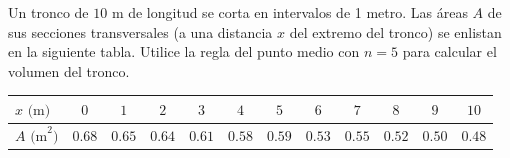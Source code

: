\item Un tronco de $10 \text{ m}$ de longitud se corta en intervalos de 1 metro. Las áreas $A$ de sus secciones transversales (a una distancia $x$ del extremo del tronco) se enlistan en la siguiente tabla. Utilice la regla del punto medio con $n = 5$ para calcular el volumen del tronco.

\begin{center}
\renewcommand{\arraystretch}{1.5}
\begin{tabular}{|l|ccccccccccc|}
\hline
$x \text{ (m)}$ & $0$ & $1$ & $2$ & $3$ & $4$ & $5$ & $6$ & $7$ & $8$ & $9$ & $10$ \\ \hline
$A \text{ (m}^2\text{)}$ & $0.68$ & $0.65$ & $0.64$ & $0.61$ & $0.58$ & $0.59$ & $0.53$ & $0.55$ & $0.52$ & $0.50$ & $0.48$ \\ \hline
\end{tabular}
\end{center}
